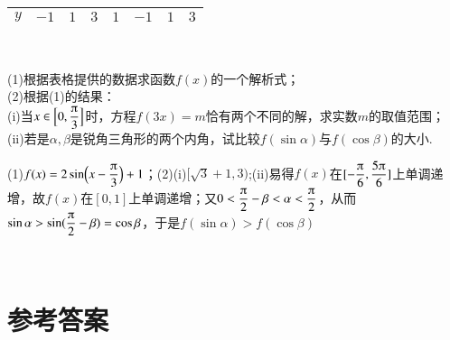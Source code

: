 \begin{exercise}
\begin{center}
\begin{tabular}{|*{8}{c|}}
          \hline
            $y$
            &$-1$
            &$1$
            &$3$
            &$1$
            &$-1$
            &$1$
            &$3$\\
          \hline
        \end{tabular}\\
      \end{center}
      (1)根据表格提供的数据求函数$f(x)$的一个解析式；\\
      (2)根据(1)的结果：\\
      \;(i)当$x\in\Bigl[0,\dfrac{\piup}3\Bigr]$时，方程$f(3x)=m$恰有两个不同的解，求实数$m$的取值范围；\\
      \;(ii)若是$\alpha,\beta$是锐角三角形的两个内角，试比较$f(\sin \alpha)$与$f(\cos \beta)$的大小.
      \begin{answer}
        (1)$f(x)=2\sin\Bigl(x-\dfrac{\piup}3\Bigr)+1$；(2)(i)$[\sqrt{3}+1,3)$;(ii)易得$f(x)$在$[-\dfrac{\piup}6,\dfrac{5\piup}6]$上单调递增，故$f(x)$在$[0,1]$上单调递增；又$0<\dfrac{\piup}2-\beta<\alpha<\dfrac{\piup}2$，从而$\sin\alpha>\sin(\dfrac{\piup}2-\beta)=\cos\beta$，于是$f(\sin \alpha)>f(\cos \beta)$
      \end{answer}
    \vspace{4cm}
  \end{exercise}
  \stopexercise
\newpage
{}\\
\part{\mbox{\heiti \xiaoer 参考答案}}
  \begin{multicols}{2}
    \printanswer
  \end{multicols}

